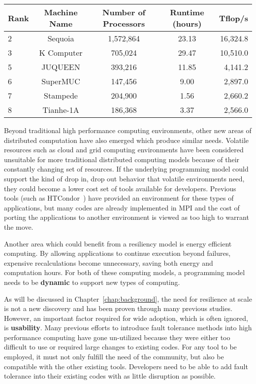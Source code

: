 \begin{table}
	\centering
	\label{tab:intro:runtime}
	\begin{tabular}[t]{| l | c | c | c | r |}
		\hline
		\textbf{Rank} & \textbf{Machine Name} & \textbf{Number of Processors} & \textbf{Runtime (hours)} & \textbf{Tflop/s} \\ \hline
		2 & Sequoia & 1,572,864 & 23.13 & 16,324.8 \\ \hline
		3 & K Computer & 705,024 & 29.47 & 10,510.0 \\ \hline
		5 & JUQUEEN & 393,216 & 11.85 & 4,141.2 \\ \hline
		6 & SuperMUC & 147,456 & 9.00 & 2,897.0 \\ \hline
		7 & Stampede & 204,900 & 1.56 & 2,660.2 \\ \hline
		8 & Tianhe-1A & 186,368 & 3.37 & 2,566.0 \\
		\hline
	\end{tabular}
\end{table}


Beyond traditional high performance computing environments, other new areas of
distributed computation have also emerged which produce similar needs. Volatile
resources such as cloud and grid computing environments have been considered 
unsuitable for more traditional distributed computing models because of their 
constantly changing set of resources. If the underlying programming model could 
support the kind of drop in, drop out behavior that volatile environments need, 
they could become a lower cost set of tools available for developers. Previous 
tools (such as HTCondor~\cite{Thain:2005wz}) have provided an environment for 
these types of applications, but many codes are already implemented in MPI and the 
cost of porting the applications to another environment is viewed as too high to 
warrant the move.

Another area which could benefit from a resiliency model is energy efficient computing. 
By allowing applications to continue execution beyond failures, expensive 
recalculations become unnecessary, saving both energy and computation hours. For both 
of these computing models, a programming model needs to be \textbf{dynamic} to support 
new types of computing.

As will be discussed in Chapter~\ref{chap:background}, the need for resilience
at scale is not a new discovery and has been proven through many previous
studies. However, an important factor required for wide adoption, which is often
ignored, is \textbf{usability}. Many previous efforts to introduce fault
tolerance methods into high performance computing have gone un-utilized because
they were either too difficult to use or required large changes to existing codes. For
any tool to be employed, it must not only fulfill the need of the community, but
also be compatible with the other existing tools. Developers need to be able to add
fault tolerance into their existing codes with as little disruption as possible.

